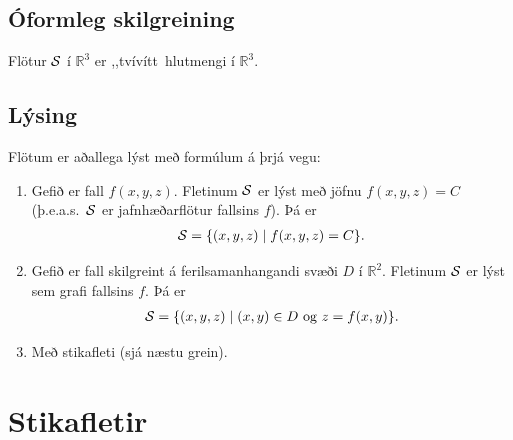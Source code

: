 \documentclass[a4paper,10pt,icelandic]{sphinxmanual}
\begin{document}
\subsection{Óformleg skilgreining}
\label{Kafli5:oformleg-skilgreining}
Flötur \(\cal S\) í \({\mathbb  R}^3\) er ,,tvívítt hlutmengi í
\({\mathbb  R}^3\).


\subsection{Lýsing}
\label{Kafli5:lysing}
Flötum er aðallega lýst með formúlum á þrjá vegu:
\begin{enumerate}
\item {} 
Gefið er fall \(f(x,y,z)\). Fletinum \(\cal S\) er lýst með
jöfnu \(f(x,y,z)=C\) (þ.e.a.s. \(\cal S\) er jafnhæðarflötur
fallsins \(f\)). Þá er
\begin{gather}
\begin{split}\displaystyle {\cal S}=\{(x,y,z)\mid f(x,y,z)=C\}.\end{split}\notag
\end{gather}
\item {} 
Gefið er fall skilgreint á ferilsamanhangandi svæði \(D\) í
\({\mathbb  R}^2\). Fletinum \(\cal S\) er lýst sem grafi
fallsins \(f\). Þá er
\begin{gather}
\begin{split}\displaystyle {\cal S}=\{(x,y,z)\mid (x,y)\in D\mbox{ og } z=f(x,y)\}.\end{split}\notag
\end{gather}
\item {} 
Með stikafleti (sjá næstu grein).

\end{enumerate}


\section{Stikafletir}
\label{Kafli5:stikafletir}
\end{document}
